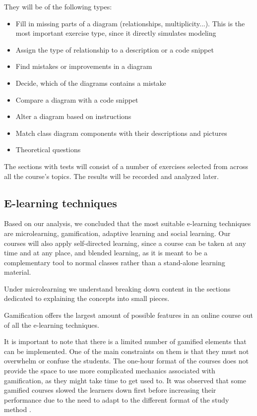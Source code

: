They will be of the following types:

\begin{itemize} \label{exercises_design}
    \item Fill in missing parts of a diagram (relationships, multiplicity...). This is the most important exercise type, since it directly simulates modeling
    \item Assign the type of relationship to a description or a code snippet
    \item Find mistakes or improvements in a diagram
    \item Decide, which of the diagrams contains a mistake
    \item Compare a diagram with a code snippet
    \item Alter a diagram based on instructions
    \item Match class diagram components with their descriptions and pictures
    \item Theoretical questions
\end{itemize}

The sections with tests will consist of a number of exercises selected from across all the course's topics. The results will be recorded and analyzed later.

\subsection{E-learning techniques}

Based on our analysis, we concluded that the most suitable e-learning techniques are microlearning, gamification, adaptive learning and social learning. Our courses will also apply self-directed learning, since a course can be taken at any time and at any place, and blended learning, as it is meant to be a complementary tool to normal classes rather than a stand-alone learning material. 

Under microlearning we understand breaking down content in the sections dedicated to explaining the concepts into small pieces.

Gamification offers the largest amount of possible features in an online course out of all the e-learning techniques. 

It is important to note that there is a limited number of gamified elements that can be implemented. One of the main constraints on them is that they must not overwhelm or confuse the students. The one-hour format of the courses does not provide the space to use more complicated mechanics associated with gamification, as they might take time to get used to. It was observed that some gamified courses slowed the learners down first before increasing their performance due to the need to adapt to the different format of the study method \cite{kim2015dynamical}.

